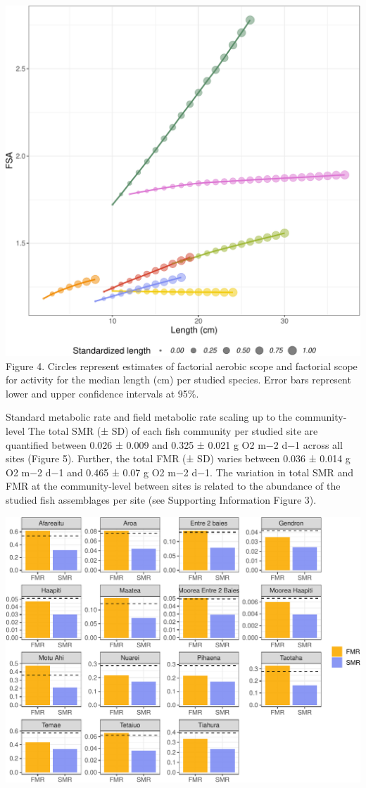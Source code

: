 \documentclass[12pt,a4paper]{article}
\makeatletter
\def\maxwidth{\ifdim\Gin@nat@width>\linewidth\linewidth
\else\Gin@nat@width\fi}
\let\Oldincludegraphics\includegraphics
\renewcommand{\includegraphics}[1]{\Oldincludegraphics[width=\maxwidth]{#1}}
\let\origfigure\figure
\let\endorigfigure\endfigure
\renewenvironment{figure}[1][2] {
    \expandafter\origfigure\expandafter[H]
} {
    \endorigfigure
}
\makeatother
\begin{document}
\includegraphics{main_text_files/figure-latex/unnamed-chunk-4-1.pdf}
Figure 4. Circles represent estimates of factorial aerobic scope and
factorial scope for activity for the median length (cm) per studied
species. Error bars represent lower and upper confidence intervals at
95\%.

\noindent  Standard metabolic rate and field metabolic rate scaling up
to the community-level The total SMR (± SD) of each fish community per
studied site are quantified between 0.026 ± 0.009 and 0.325 ± 0.021 g O2
m−2 d−1 across all sites (Figure 5). Further, the total FMR (± SD)
varies between 0.036 ± 0.014 g O2 m−2 d−1 and 0.465 ± 0.07 g O2 m−2 d−1.
The variation in total SMR and FMR at the community-level between sites
is related to the abundance of the studied fish assemblages per site
(see Supporting Information Figure 3).

\begin{figure}
\centering
\includegraphics{main_text_files/figure-latex/unnamed-chunk-5-1.pdf}
\caption{teest}
\end{figure}
\end{document}
